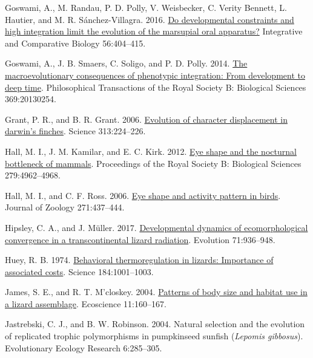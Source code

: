 \documentclass[
  11pt,
]{article}
\newlength{\cslhangindent}
\newlength{\cslentryspacingunit} %
\newenvironment{CSLReferences}[2] %
 {%
  \setlength{\parindent}{0pt}
  \ifodd #1
  \let\oldpar\par
  \def\par{\hangindent=\cslhangindent\oldpar}
  \fi
  \setlength{\parskip}{#2\cslentryspacingunit}
 }%
 {}
\begin{document}
\begin{CSLReferences}{1}{0}
\leavevmode{}%
Goswami, A., M. Randau, P. D. Polly, V. Weisbecker, C. Verity Bennett,
L. Hautier, and M. R. Sánchez-Villagra. 2016.
\href{https://doi.org/10.1093/icb/icw039}{Do developmental constraints
and high integration limit the evolution of the marsupial oral
apparatus?} Integrative and Comparative Biology 56:404--415.

\leavevmode{}%
Goswami, A., J. B. Smaers, C. Soligo, and P. D. Polly. 2014.
\href{https://doi.org/10.1098/rstb.2013.0254}{The macroevolutionary
consequences of phenotypic integration: From development to deep time}.
Philosophical Transactions of the Royal Society B: Biological Sciences
369:20130254.

\leavevmode{}%
Grant, P. R., and B. R. Grant. 2006.
\href{https://doi.org/10.1126/science.1128374}{Evolution of character
displacement in darwin's finches}. Science 313:224--226.

\leavevmode{}%
Hall, M. I., J. M. Kamilar, and E. C. Kirk. 2012.
\href{https://doi.org/10.1098/rspb.2012.2258}{Eye shape and the
nocturnal bottleneck of mammals}. Proceedings of the Royal Society B:
Biological Sciences 279:4962--4968.

\leavevmode{}%
Hall, M. I., and C. F. Ross. 2006.
\href{https://doi.org/10.1111/j.1469-7998.2006.00227.x}{Eye shape and
activity pattern in birds}. Journal of Zoology 271:437--444.

\leavevmode{}%
Hipsley, C. A., and J. Müller. 2017.
\href{https://doi.org/10.1111/evo.13186}{{Developmental dynamics of
ecomorphological convergence in a transcontinental lizard radiation}}.
Evolution 71:936--948.

\leavevmode{}%
Huey, R. B. 1974.
\href{https://doi.org/10.1126/science.184.4140.1001}{Behavioral
thermoregulation in lizards: Importance of associated costs}. Science
184:1001--1003.

\leavevmode{}%
James, S. E., and R. T. M'closkey. 2004.
\href{https://doi.org/10.1080/11956860.2004.11682820}{Patterns of body
size and habitat use in a lizard assemblage}. Ecoscience 11:160--167.

\leavevmode{}%
Jastrebski, C. J., and B. W. Robinson. 2004. Natural selection and the
evolution of replicated trophic polymorphisms in pumpkinseed sunfish
(\emph{{L}epomis gibbosus}). Evolutionary Ecology Research 6:285--305.


\end{CSLReferences}
\end{document}

